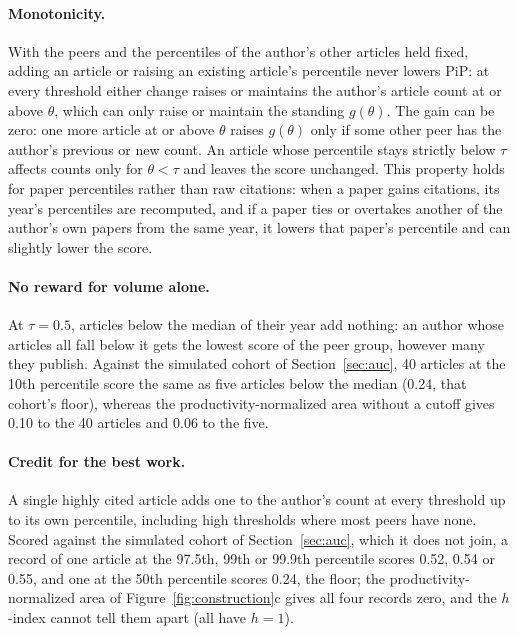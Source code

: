 \documentclass[11pt]{article}
\begin{document}
\paragraph{Monotonicity.} With the peers and the percentiles of the author's other articles held fixed, adding an
article or raising an existing article's percentile never lowers PiP: at every threshold either change raises or
maintains the author's article count at or above $\theta$, which can only raise or maintain the standing $g(\theta)$.
The gain can be zero: one more article at or above $\theta$ raises $g(\theta)$ only if some other peer has the author's
previous or new count. An article whose percentile stays strictly below $\tau$ affects counts only for $\theta < \tau$ and
leaves the score unchanged. This property holds for paper percentiles rather than raw citations: when a paper gains
citations, its year's percentiles are recomputed, and if a paper ties or overtakes another of the author's own papers
from the same year, it lowers that paper's percentile and can slightly lower the score.

\paragraph{No reward for volume alone.} At $\tau = 0.5$, articles below the median of their year add nothing: an author
whose articles all fall below it gets the lowest score of the peer group, however many they publish. Against the
simulated cohort of Section~\ref{sec:auc}, 40 articles at the 10th percentile score the same as five articles below the
median (0.24, that cohort's floor), whereas the productivity-normalized area without a cutoff gives 0.10 to the 40
articles and 0.06 to the five.

\paragraph{Credit for the best work.} A single highly cited article adds one to the author's count at every threshold up
to its own percentile, including high thresholds where most peers have none. Scored against the simulated cohort of
Section~\ref{sec:auc}, which it does not join, a record of one article at the 97.5th, 99th or 99.9th percentile scores
0.52, 0.54 or 0.55, and one at the 50th percentile scores 0.24, the floor; the productivity-normalized area of
Figure~\ref{fig:construction}c gives all four records zero, and the $h$-index cannot tell them apart (all have $h = 1$).
\end{document}
